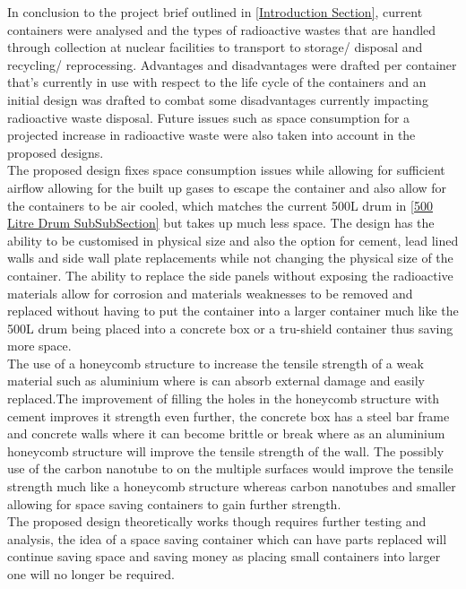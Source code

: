 In conclusion to the project brief outlined in \cref{Introduction Section}, current containers were analysed and the types of radioactive wastes that are handled through collection at nuclear facilities to transport to storage/ disposal and recycling/ reprocessing. Advantages and disadvantages were drafted per container that's currently in use with respect to the life cycle of the containers and an initial design was drafted to combat some disadvantages currently impacting radioactive waste disposal. Future issues such as space consumption for a projected increase in radioactive waste were also taken into account in the proposed designs. \\

The proposed design fixes space consumption issues while allowing for sufficient airflow allowing for the built up gases to escape the container and also allow for the containers to be air cooled, which matches the current 500L drum in \cref{500 Litre Drum SubSubSection} but takes up much less space. The design has the ability to be customised in physical size and also the option for cement, lead lined walls and side wall plate replacements while not changing the physical size of the container. The ability to replace the side panels without exposing the radioactive materials allow for corrosion and materials weaknesses to be removed and replaced without having to put the container into a larger container much like the 500L drum being placed into a concrete box or a tru-shield container thus saving more space. \\

The use of a honeycomb structure to increase the tensile strength of a weak material such as aluminium where is can absorb external damage and easily replaced.The improvement of filling the holes in the honeycomb structure with cement improves it strength even further, the concrete box has a steel bar frame and concrete walls where it can become brittle or break where as an aluminium honeycomb structure will improve the tensile strength of the wall. The possibly use of the carbon nanotube to on the multiple surfaces would improve the tensile strength much like a honeycomb structure whereas carbon nanotubes and smaller allowing for space saving containers to gain further strength.\\

The proposed design theoretically works though requires further testing and analysis, the idea of a space saving container which can have parts replaced will continue saving space and saving money as placing small containers into larger one will no longer be required.
